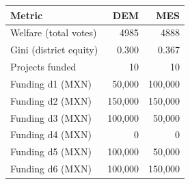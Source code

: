 \begin{tabular}{lrr}
\toprule
\textbf{Metric} & \textbf{DEM} & \textbf{MES} \\
\midrule
Welfare (total votes) & 4985 & 4888 \\
Gini (district equity) & 0.300 & 0.367 \\
Projects funded & 10 & 10 \\
\midrule
Funding d1 (MXN) & 50,000 & 100,000 \\
Funding d2 (MXN) & 150,000 & 150,000 \\
Funding d3 (MXN) & 100,000 & 50,000 \\
Funding d4 (MXN) & 0 & 0 \\
Funding d5 (MXN) & 100,000 & 50,000 \\
Funding d6 (MXN) & 100,000 & 150,000 \\
\bottomrule
\end{tabular}
